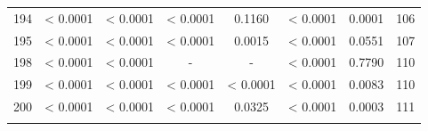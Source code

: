 {\begin{longtable}{cccccccc}
194 & {\color{red} < 0.0001} & {\color{red} < 0.0001} & {\color{red} < 0.0001} & 0.1160 & {\color{red} < 0.0001} & {\color{red}0.0001} & 106 \\
195 & {\color{red} < 0.0001} & {\color{red} < 0.0001} & {\color{red} < 0.0001} & {\color{red}0.0015} & {\color{red} < 0.0001} & {\color{red}0.0551} & 107 \\
198 & {\color{red} < 0.0001} & {\color{red} < 0.0001} & - & - & {\color{red} < 0.0001} & 0.7790 & 110 \\
199 & {\color{red} < 0.0001} & {\color{red} < 0.0001} & {\color{red} < 0.0001} & {\color{red} < 0.0001} & {\color{red} < 0.0001} & {\color{red}0.0083} & 110 \\
200 & {\color{red} < 0.0001} & {\color{red} < 0.0001} & {\color{red} < 0.0001} & {\color{red}0.0325} & {\color{red} < 0.0001} & {\color{red}0.0003} & 111 \\ \hline       
\label{tab:sorirotation1}
\end{longtable}
}

